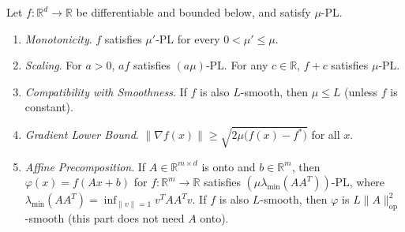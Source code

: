 	\begin{lemma}
	  \label{thm:properties-of-the-pl-inequality}
		Let $f: \mathbb{R}^d \to \mathbb{R}$ be differentiable and bounded below, and satisfy $\mu$-PL. 
		\begin{enumerate}
		  \item \textit{Monotonicity}. $f$ satisfies $\mu'$-PL for every $0 < \mu' \leq \mu$. 
			\item \textit{Scaling}. For $a > 0$, $af$ satisfies $(a\mu)$-PL. For any $c \in \mathbb{R}$, $f + c$ satisfies $\mu$-PL. 
			\item \textit{Compatibility with Smoothness}. If $f$ is also $L$-smooth, then $\mu \leq L$ (unless $f$ is constant). 
			\item \textit{Gradient Lower Bound}. $\|\nabla f(x)\| \geq \sqrt{2\mu \big( f(x) - f^\ast \big)}$ for all $x$. 
			\item \textit{Affine Precomposition}. If $A \in \mathbb{R}^{m \times d}$ is onto and $b \in \mathbb{R}^m$, then $\varphi(x) = f(Ax + b)$ for $f: \mathbb{R}^m \to \mathbb{R}$ satisfies $(\mu \lambda_{\min}(AA^T))$-PL, where $\lambda_{\min}(AA^T) = \inf_{\|v\| = 1} v^T A A^T v$. If $f$ is also $L$-smooth, then $\varphi$ is $L \|A\|_{\mathrm{op}}^2$-smooth (this part does not need $A$ onto). 
		\end{enumerate}
	\end{lemma}
